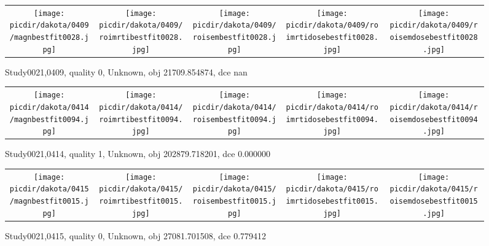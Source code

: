 \documentclass{article}
\newcommand{\picdir}{pdffig}
\begin{document}
\begin{figure} \begin{tabular}{ccccc} \scalebox{0.21}{\texttt{[image: \\picdir/dakota/0409/magnbestfit0028.jpg]}} & \scalebox{0.21}{\texttt{[image: \\picdir/dakota/0409/roimrtibestfit0028.jpg]}} & \scalebox{0.21}{\texttt{[image: \\picdir/dakota/0409/roisembestfit0028.jpg]}}  & \scalebox{0.21}{\texttt{[image: \\picdir/dakota/0409/roimrtidosebestfit0028.jpg]}} & \scalebox{0.21}{\texttt{[image: \\picdir/dakota/0409/roisemdosebestfit0028.jpg]}} \end{tabular} \caption{Study0021,0409, quality 0, Unknown, obj 21709.854874, dce nan  } \label{Study00210409} \end{figure}
\begin{figure} \begin{tabular}{ccccc} \scalebox{0.21}{\texttt{[image: \\picdir/dakota/0414/magnbestfit0094.jpg]}} & \scalebox{0.21}{\texttt{[image: \\picdir/dakota/0414/roimrtibestfit0094.jpg]}} & \scalebox{0.21}{\texttt{[image: \\picdir/dakota/0414/roisembestfit0094.jpg]}}  & \scalebox{0.21}{\texttt{[image: \\picdir/dakota/0414/roimrtidosebestfit0094.jpg]}} & \scalebox{0.21}{\texttt{[image: \\picdir/dakota/0414/roisemdosebestfit0094.jpg]}} \end{tabular} \caption{Study0021,0414, quality 1, Unknown, obj 202879.718201, dce 0.000000  } \label{Study00210414} \end{figure}
\begin{figure} \begin{tabular}{ccccc} \scalebox{0.21}{\texttt{[image: \\picdir/dakota/0415/magnbestfit0015.jpg]}} & \scalebox{0.21}{\texttt{[image: \\picdir/dakota/0415/roimrtibestfit0015.jpg]}} & \scalebox{0.21}{\texttt{[image: \\picdir/dakota/0415/roisembestfit0015.jpg]}}  & \scalebox{0.21}{\texttt{[image: \\picdir/dakota/0415/roimrtidosebestfit0015.jpg]}} & \scalebox{0.21}{\texttt{[image: \\picdir/dakota/0415/roisemdosebestfit0015.jpg]}} \end{tabular} \caption{Study0021,0415, quality 0, Unknown, obj 27081.701508, dce 0.779412  } \label{Study00210415} \end{figure}
\clearpage
\end{document}
